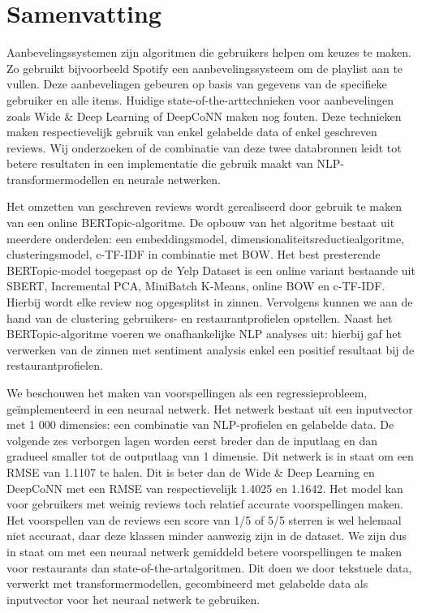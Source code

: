 \chapter[Nederlandstalige samenvatting]{Samenvatting}

Aanbevelingssystemen zijn algoritmen die gebruikers helpen om keuzes te maken. Zo gebruikt bijvoorbeeld Spotify een aanbevelingssysteem om de  playlist aan te vullen. Deze aanbevelingen gebeuren op basis van gegevens van de specifieke gebruiker en alle items. Huidige state-of-the-arttechnieken voor aanbevelingen zoals Wide \& Deep Learning of DeepCoNN maken nog fouten.\newline
Deze technieken maken respectievelijk gebruik van enkel gelabelde data of enkel geschreven reviews. Wij onderzoeken of de combinatie van deze twee databronnen leidt tot betere resultaten in een implementatie die gebruik maakt van NLP-transformermodellen en neurale netwerken.


Het omzetten van geschreven reviews wordt gerealiseerd door gebruik te maken van een online BERTopic-algoritme. De opbouw van het algoritme bestaat uit meerdere onderdelen: een embeddingsmodel, dimensionaliteitsreductiealgoritme, clusteringsmodel, c-TF-IDF in combinatie met BOW. Het best presterende BERTopic-model toegepast op de Yelp Dataset is een online variant bestaande uit SBERT, Incremental PCA, MiniBatch K-Means, online BOW en c-TF-IDF.\newline
Hierbij wordt elke review nog opgesplitst in zinnen. Vervolgens kunnen we aan de hand van de clustering gebruikers- en restaurantprofielen opstellen. Naast het BERTopic-algoritme voeren we onafhankelijke NLP analyses uit: hierbij gaf het verwerken van de zinnen met sentiment analysis enkel een positief resultaat bij de restaurantprofielen.

We beschouwen het maken van voorspellingen als een regressieprobleem, geïmplementeerd in een neuraal netwerk. Het netwerk bestaat uit een inputvector met 1 000 dimensies: een combinatie van NLP-profielen en gelabelde data. De volgende zes verborgen lagen worden eerst breder dan de inputlaag en dan gradueel smaller tot de outputlaag van 1 dimensie. Dit netwerk is in staat om een RMSE van 1.1107 te halen. Dit is beter dan de Wide \& Deep Learning en DeepCoNN met een RMSE van respectievelijk 1.4025 en 1.1642. Het model kan voor gebruikers met weinig reviews toch relatief accurate voorspellingen maken. Het voorspellen van de reviews een score van 1/5 of 5/5 sterren is wel helemaal niet accuraat, daar deze klassen minder aanwezig zijn in de dataset.\newline
We zijn dus in staat om met een neuraal netwerk gemiddeld betere voorspellingen te maken voor restaurants dan state-of-the-artalgoritmen. Dit doen we door tekstuele data, verwerkt met transformermodellen, gecombineerd met gelabelde data als inputvector voor het neuraal netwerk te gebruiken.
